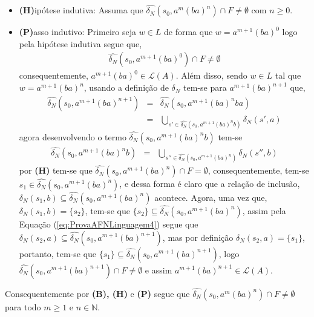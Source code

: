 \begin{prova}
\begin{itemize}
		\item[ ] \textbf{(H)}ipótese indutiva: Assuma que $\widehat{\delta_N}(s_0, a^m(ba)^n)  \cap F \neq \emptyset$ com $n \geq 0$.
		\item[ ] \textbf{(P)}asso indutivo: Primeiro seja $w \in L$ de forma que $w = a^{m+1}(ba)^0$ logo pela hipótese indutiva segue que,
		\begin{eqnarray*}
			\widehat{\delta_N}(s_0, a^{m+1}(ba)^0) \cap F \neq \emptyset
		\end{eqnarray*}
		consequentemente, $a^{m+1}(ba)^0 \in \mathcal{L}(A)$. Além disso, sendo $w \in L$ tal que $w = a^{m+1}(ba)^n$, usando a  definição de $\widehat{\delta_N}$ tem-se para $a^{m+1}(ba)^{n+1}$ que, 
		\begin{eqnarray}\label{eq:ProvaAFNLinguagem4}
			\widehat{\delta_N}(s_0, a^{m+1}(ba)^{n+1}) & = & \widehat{\delta_N}(s_0, a^{m+1}(ba)^{n}ba)\nonumber\\
			& = & \bigcup_{s' \in \widehat{\delta_N}(s_0, a^{m+1}(ba)^{n}b)} \delta_N(s', a)
		\end{eqnarray}
		agora desenvolvendo o termo $\widehat{\delta_N}(s_0, a^{m+1}(ba)^{n}b)$ tem-se
		\begin{eqnarray*}
			\widehat{\delta_N}(s_0, a^{m+1}(ba)^{n}b) & = & \bigcup_{s'' \in \widehat{\delta_N}(s_0, a^{m+1}(ba)^{n})} \delta_N(s'', b)
		\end{eqnarray*}
		por \textbf{(H)} tem-se que $\widehat{\delta_N}(s_0, a^{m+1}(ba)^{n}) \cap F = \emptyset$, consequentemente, tem-se $s_1 \in \widehat{\delta_N}(s_0, a^{m+1}(ba)^{n})$, e dessa forma é claro que a relação de inclusão, $\delta_N(s_1, b) \subseteq \widehat{\delta_N}(s_0, a^{m+1}(ba)^{n})$ acontece. Agora, uma vez que, $\delta_N(s_1, b) = \{s_2\}$, tem-se que $\{s_2\} \subseteq \widehat{\delta_N}(s_0, a^{m+1}(ba)^{n})$, assim pela Equação (\ref{eq:ProvaAFNLinguagem4}) segue que $\delta_N(s_2, a) \subseteq \widehat{\delta_N}(s_0, a^{m+1}(ba)^{n+1})$, mas por definição $\delta_N(s_2, a) = \{s_1\}$, portanto, tem-se que $\{s_1\} \subseteq \widehat{\delta_N}(s_0, a^{m+1}(ba)^{n+1})$, logo $\widehat{\delta_N}(s_0, a^{m+1}(ba)^{n+1}) \cap F \neq \emptyset$ e assim $a^{m+1}(ba)^{n+1} \in \mathcal{L}(A)$.
	\end{itemize}
	Consequentemente por \textbf{(B), (H)} e \textbf{(P)} segue que $\widehat{\delta_N}(s_0, a^{m}(ba)^{n}) \cap F \neq \emptyset$ para todo $m \geq 1$ e $n \in \mathbb{N}$.


\end{prova}
